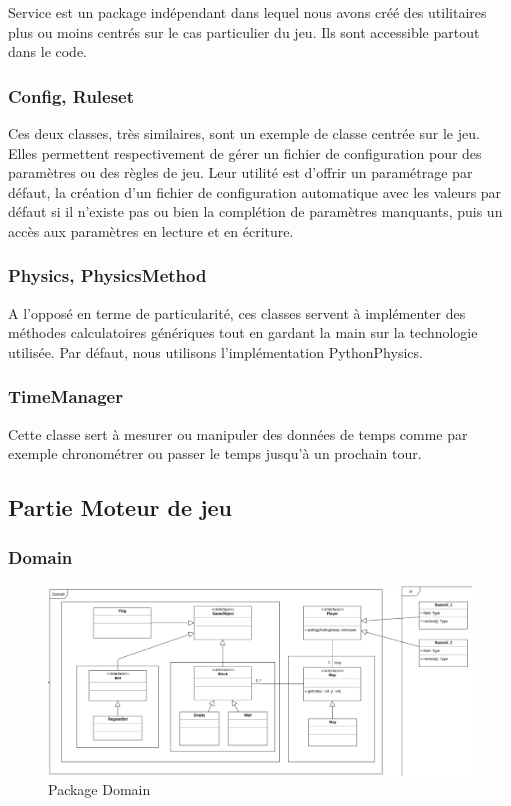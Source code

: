 Service est un package indépendant dans lequel nous avons créé des utilitaires plus ou moins centrés sur le cas particulier du jeu. Ils sont accessible partout dans le code.

\subsubsection{Config, Ruleset}

Ces deux classes, très similaires, sont un exemple de classe centrée sur le jeu. Elles permettent respectivement de gérer un fichier de configuration pour des paramètres ou des règles de jeu. Leur utilité est d'offrir un paramétrage par défaut, la création d'un fichier de configuration automatique avec les valeurs par défaut si il n'existe pas ou bien la complétion de paramètres manquants, puis un accès aux paramètres en lecture et en écriture.

\subsubsection{Physics, PhysicsMethod}

A l'opposé en terme de particularité, ces classes servent à implémenter des méthodes calculatoires génériques tout en gardant la main sur la technologie utilisée. Par défaut, nous utilisons l'implémentation PythonPhysics.

\subsubsection{TimeManager}

Cette classe sert à mesurer ou manipuler des données de temps comme par exemple chronométrer ou passer le temps jusqu'à un prochain tour.

\subsection{Partie Moteur de jeu}

\subsubsection{Domain}

\begin{figure}[H]
    \centering
    \includegraphics[scale=0.35]{data/archi/domain.png}
    \caption{Package Domain}
\end{figure}

